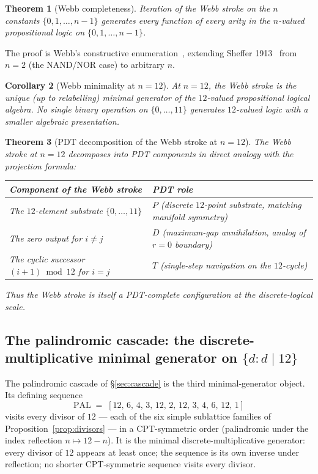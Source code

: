 \documentclass[11pt,a4paper]{article}
\newtheorem{theorem}{Theorem}[section]
\newtheorem{corollary}[theorem]{Corollary}
\theoremstyle{definition}
\theoremstyle{remark}
\begin{document}
\begin{theorem}[Webb completeness]\label{thm:webb-complete}
Iteration of the Webb stroke on the $n$ constants $\{0,1,\ldots,n-1\}$ generates every function of every arity in the $n$-valued propositional logic on $\{0,1,\ldots,n-1\}$.
\end{theorem}

The proof is Webb's constructive enumeration~\cite{Webb1935}, extending Sheffer 1913~\cite{Sheffer1913} from $n=2$ (the NAND/NOR case) to arbitrary $n$.

\begin{corollary}[Webb minimality at $n=12$]\label{cor:webb-minimal}
At $n=12$, the Webb stroke is the unique (up to relabelling) minimal generator of the $12$-valued propositional logical algebra. No single binary operation on $\{0,\ldots,11\}$ generates $12$-valued logic with a smaller algebraic presentation.
\end{corollary}

\begin{theorem}[PDT decomposition of the Webb stroke at $n=12$]\label{thm:webb-pdt}
The Webb stroke at $n=12$ decomposes into PDT components in direct analogy with the projection formula:
\begin{center}
\begin{tabular}{@{}l l@{}}
\toprule
Component of the Webb stroke & PDT role\\
\midrule
The $12$-element substrate $\{0,\ldots,11\}$ & $P$ (discrete $12$-point substrate, matching manifold symmetry)\\
The zero output for $i\ne j$ & $D$ (maximum-gap annihilation, analog of $r=0$ boundary)\\
The cyclic successor $(i+1)\bmod 12$ for $i=j$ & $T$ (single-step navigation on the $12$-cycle)\\
\bottomrule
\end{tabular}
\end{center}
Thus the Webb stroke is itself a PDT-complete configuration at the discrete-logical scale.
\end{theorem}

\subsection{The palindromic cascade: the discrete-multiplicative minimal generator on $\{d:d\mid 12\}$}\label{subsec:palindromic}

The palindromic cascade of \S\ref{sec:cascade} is the third minimal-generator object. Its defining sequence
\[
\text{PAL} \;=\; [12,\,6,\,4,\,3,\,12,\,2,\,12,\,3,\,4,\,6,\,12,\,1]
\]
visits every divisor of $12$ --- each of the six simple sublattice families of Proposition~\ref{prop:divisors} --- in a CPT-symmetric order (palindromic under the index reflection $n\mapsto 12-n$). It is the minimal discrete-multiplicative generator: every divisor of $12$ appears at least once; the sequence is its own inverse under reflection; no shorter CPT-symmetric sequence visits every divisor.
\end{document}
